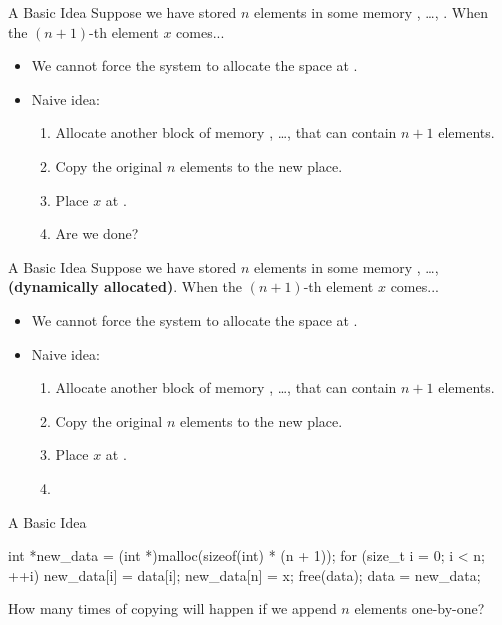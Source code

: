 \documentclass{beamer}
\begin{document}
\begin{frame}{A Basic Idea}
    Suppose we have stored \(n\) elements in some  memory , \dots, . When the \((n+1)\)-th element \(x\) comes...
    \begin{itemize}
        \item We cannot force the system to allocate the space at .
        \pause
        \item Naive idea:
        \begin{enumerate}
            \item Allocate another block of memory , \dots,  that can contain \(n+1\) elements.
            \item Copy the original \(n\) elements to the new place.
            \item Place \(x\) at .
            \pause
            \item Are we done?
        \end{enumerate}
    \end{itemize}
\end{frame}

\begin{frame}{A Basic Idea}
    Suppose we have stored \(n\) elements in some  memory , \dots,  \textbf{(dynamically allocated)}. When the \((n+1)\)-th element \(x\) comes...
    \begin{itemize}
        \item We cannot force the system to allocate the space at .
        \item Naive idea:
        \begin{enumerate}
            \item Allocate another block of memory , \dots,  that can contain \(n+1\) elements.
            \item Copy the original \(n\) elements to the new place.
            \item Place \(x\) at .
            \item {}
        \end{enumerate}
    \end{itemize}
\end{frame}

\begin{frame}[fragile]{A Basic Idea}
    \begin{cpp}
int *new_data = (int *)malloc(sizeof(int) * (n + 1));
for (size_t i = 0; i < n; ++i)
  new_data[i] = data[i];
new_data[n] = x;
free(data);
data = new_data;
    \end{cpp}
    \pause
    \begin{question}
        How many times of copying will happen if we append \(n\) elements one-by-one?
    \end{question}
\end{frame}
\end{document}
